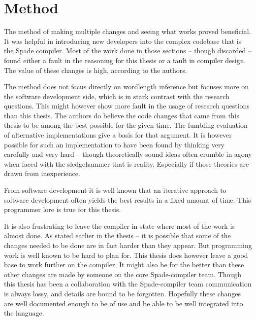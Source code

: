 \documentclass[msc,lith,english]{liuthesis}
\begin{document}

\section{Method}
The method of making multiple changes and seeing what works proved beneficial. It was helpful in introducing new developers into the complex codebase that is the Spade compiler. Most of the work done in those sections -- though discarded -- found either a fault in the reasoning for this thesis or a fault in compiler design. The value of these changes is high, according to the authors.

The method does not focus directly on wordlength inference but focuses more on the software development side, which is in stark contrast with the research questions. This might however show more fault in the usage of research questions than this thesis. The authors do believe the code changes that came from this thesis to be among the best possible for the given time. The fumbling evaluation of alternative implementations give a basis for that argument. It is however possible for such an implementation to have been found by thinking very carefully and very hard -- though theoretically sound ideas often crumble in agony when faced with the sledgehammer that is reality. Especially if those theories are drawn from inexperience.

From software development it is well known that an iterative approach to software development often yields the best results in a fixed amount of time. This programmer lore is true for this thesis.

It is also frustrating to leave the compiler in state where most of the work is almost done. As stated earlier in the thesis -- it is possible that some of the changes needed to be done are in fact harder than they appear. But programming work is well known to be hard to plan for. This thesis does however leave a good base to work further on the compiler. It might also be for the better than these other changes are made by someone on the core Spade-compiler team. Though this thesis has been a collaboration with the Spade-compiler team communication is always lossy, and details are bound to be forgotten. Hopefully these changes are well documented enough to be of use and be able to be well integrated into the language.
\end{document}
